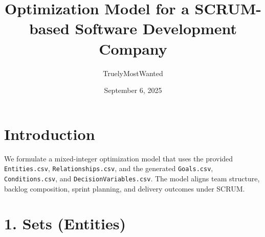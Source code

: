 \documentclass[11pt,a4paper]{article}
\title{Optimization Model for a SCRUM-based Software Development Company}
\author{TruelyMostWanted}
\date{September 6, 2025}
\begin{document}
\maketitle
\tableofcontents
\newpage

\section*{Introduction}
We formulate a mixed-integer optimization model that uses the provided \texttt{Entities.csv}, \texttt{Relationships.csv}, and the generated \texttt{Goals.csv}, \texttt{Conditions.csv}, and \texttt{DecisionVariables.csv}. The model aligns team structure, backlog composition, sprint planning, and delivery outcomes under SCRUM.

\section{1. Sets (Entities)}
\end{document}
